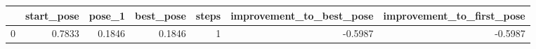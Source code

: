 \begin{tabular}{lrrrrrr}
\toprule
{} &  start\_pose &  pose\_1 &  best\_pose &  steps &  improvement\_to\_best\_pose &  improvement\_to\_first\_pose \\
\midrule
0 &      0.7833 &  0.1846 &     0.1846 &      1 &                   -0.5987 &                    -0.5987 \\
\bottomrule
\end{tabular}
